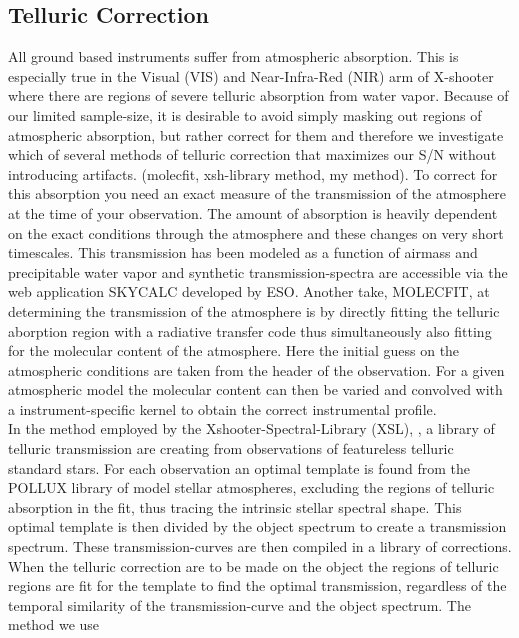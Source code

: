 \documentclass[iop]{emulateapj}
\begin{document}
\subsection{Telluric Correction}
All ground based instruments suffer from atmospheric absorption. This is especially true in the Visual (VIS) and Near-Infra-Red (NIR) arm of X-shooter where there are regions of severe telluric absorption from water vapor.  Because of our limited sample-size, it is desirable to avoid simply masking out regions of atmospheric absorption, but rather correct for them and therefore we investigate which of several methods of telluric correction that maximizes our S/N without introducing artifacts. (molecfit, xsh-library method, my method). To correct for this absorption you need an exact measure of the transmission of the atmosphere at the time of your observation. The amount of absorption is heavily dependent on the exact conditions through the atmosphere and these changes on very short timescales. This transmission has been modeled as a function of airmass and precipitable water vapor and synthetic transmission-spectra are accessible via the web application SKYCALC developed by ESO.  Another take, MOLECFIT, at determining the transmission of the atmosphere is by directly fitting the telluric aborption region with a radiative transfer code thus simultaneously also fitting for the molecular content of the atmosphere. Here the initial guess on the atmospheric conditions are taken from the header of the observation. For a given atmospheric model the molecular content can then be varied and convolved with a instrument-specific kernel to obtain the correct instrumental profile. \\
In the method employed by the Xshooter-Spectral-Library (XSL), \cite{Chen2014b}, a library of telluric transmission are creating from observations of featureless telluric standard stars. For each observation an optimal template is found from the POLLUX library of model stellar atmospheres, excluding the regions of telluric absorption in the fit, thus tracing the intrinsic stellar spectral shape. This optimal template is then divided by the object spectrum to create a transmission spectrum. These transmission-curves are then compiled in a library of corrections. When the telluric correction are to be made on the object the regions of telluric regions are fit for the template to find the optimal transmission, regardless of the temporal similarity of the transmission-curve and the object spectrum. The method we use
\end{document}
